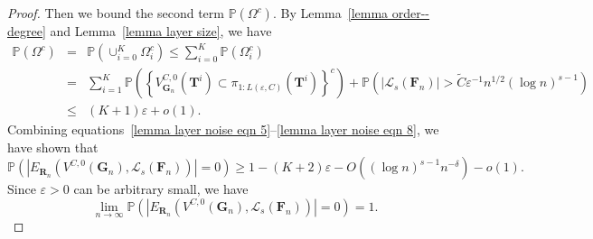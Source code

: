 \documentclass[twoside,11pt]{article}
\theoremstyle{remark}
\begin{document}
\begin{proof}
Then we bound the second term $\mathbb{P}\left(\Omega^c\right)$. 
By Lemma~\ref{lemma order--degree} and Lemma~\ref{lemma layer size}, we have
%
\begingroup
\begin{eqnarray}
  \label{lemma layer noise eqn 8}
  \nonumber
\mathbb{P}\left(\Omega^c\right)&=&\mathbb{P}\left(\cup_{i=0}^K \Omega_i^c\right)\le \sum_{i=0}^K \mathbb{P}\left(\Omega_i^c\right)\\
\nonumber
&=& \sum_{i=1}^K \mathbb{P}\left(\left\{ V^{C,0}_{\boldsymbol{G}_n}\left(\boldsymbol{T}^i\right)\subset\pi_{1:{L\left(\varepsilon, C\right)}}\left(\boldsymbol{T}^i\right)\right\}^c\right)+\mathbb{P}\left(\left|\mathcal{L}_s\left(\boldsymbol{F}_n\right)\right|>\tilde{C}\varepsilon^{-1}n^{1/2}\left(\log n\right)^{s-1}\right)\\
&\le &\left(K+1\right)\varepsilon + o(1).
\end{eqnarray}
\endgroup
%
Combining equations~\eqref{lemma layer noise eqn 5}–\eqref{lemma layer noise eqn 8}, we have shown that
%
\begin{equation*}  \mathbb{P}\left(\left|E_{\boldsymbol{R}_n}\left(V^{C,0}\left(\boldsymbol{G}_n\right),\mathcal{L}_s\left(\boldsymbol{F}_n\right)\right)\right|=0\right)\geq 1-\left(K+2\right)\varepsilon-O\left(\left(\log n\right)^{s-1}n^{-\delta}\right)-o\left(1\right).
\end{equation*}
%
Since $\varepsilon>0$ can be arbitrary small, we have 
%
\begin{equation*}
     \lim_{n\rightarrow \infty} \mathbb{P}\left(\left|E_{\boldsymbol{R}_n}\left(V^{C,0}\left(\boldsymbol{G}_n\right),\mathcal{L}_s\left(\boldsymbol{F}_n\right)\right)\right|=0\right)=1.
\end{equation*}
%


\end{proof}
\end{document}
